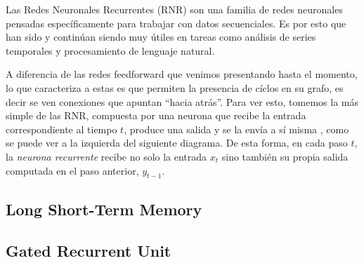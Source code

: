 \documentclass[../../main.tex]{subfiles}
\begin{document}
Las Redes Neuronales Recurrentes (RNR) son una familia de redes neuronales pensadas
específicamente para trabajar con datos secuenciales. Es por esto que han sido y continúan
siendo muy útiles en tareas como análisis de series temporales y procesamiento de
lenguaje natural.

A diferencia de las redes feedforward que venimos presentando hasta el momento, lo que
caracteriza a estas es que permiten la presencia de cíclos en su grafo, es decir se ven
conexiones que apuntan ``hacia atrás''. Para ver esto, tomemos la más simple de las RNR,
compuesta por una neurona que recibe la entrada correspondiente al tiempo \(t\), produce
una salida y se la envía a sí misma \cite{hands-on-ML-sklearn-tf}, como se puede ver
a la izquierda del siguiente diagrama. De esta forma, en cada paso \(t\), la \textit{neurona
recurrente} recibe no solo la entrada \(x_t\) sino también su propia salida computada
en el paso anterior, \(y_{t-1}\).

\begin{center}
\end{center}

\subsection{Long Short-Term Memory}

\subsection{Gated Recurrent Unit}
\end{document}
